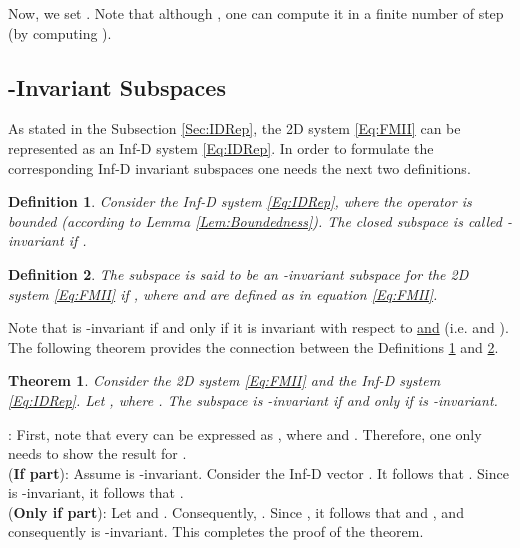 \documentclass[journal,12pt,draftcls,onecolumn]{IEEEtran}
\newcommand{\infd}{Inf-D }
\def\QEDclosed{\hfill\IEEEQEDclosed}
\renewcommand{\qed}{\QEDclosed}
\renewenvironment{proof}[1][\proofname]{\noindent\nobreakspace{\bfseries #1}:\;}{\qed\par}
\newtheorem{theorem}{Theorem}
\newtheorem{definition}{Definition}
\begin{document}
Now, we set . Note that although , one can compute it in a finite number of step (by computing ).

\subsection{-Invariant Subspaces}\label{Sec:A12Inv}
As stated in the Subsection \ref{Sec:IDRep}, the 2D system \eqref{Eq:FMII} can be represented as an \infd system \eqref{Eq:IDRep}. In order to formulate the corresponding Inf-D invariant subspaces one needs the next two definitions.
\begin{definition}\cite{Zwart_Book}\label{Def:AID_Inv}
	Consider the \infd system \eqref{Eq:IDRep}, where the operator  is bounded (according to Lemma \ref{Lem:Boundedness}). The closed subspace  is called -invariant if .\qed
\end{definition}

\begin{definition}\cite{conte1988GeometryConf}\label{Def:A12_Inv}
	The subspace   is said to be an {\it -invariant subspace} for the 2D system \eqref{Eq:FMII} if
,
where  and  are defined as in equation \eqref{Eq:FMII}.\qed
\end{definition}
Note that  is -invariant if and only if it is invariant with respect to  \underline{and}  (i.e.  and ).
The following theorem provides the connection between the Definitions \ref{Def:AID_Inv} and \ref{Def:A12_Inv}.
\begin{theorem}\label{Thm:AID_A12Inv}
	Consider the 2D system \eqref{Eq:FMII} and the \infd system \eqref{Eq:IDRep}. Let , where . The subspace  is -invariant if and only if  is -invariant.
\end{theorem}
\begin{proof}
	First, note that every  can be expressed as , where  and . Therefore, one only needs to show the result for .\\
	({\bf If part}): Assume  is -invariant. Consider the Inf-D vector . It follows that   . Since  is -invariant, it follows that . \\
	({\bf Only if part}): Let  and . Consequently, . Since  , it follows that  and , and consequently  is -invariant. This completes the proof of the theorem.
\end{proof}
\end{document}
